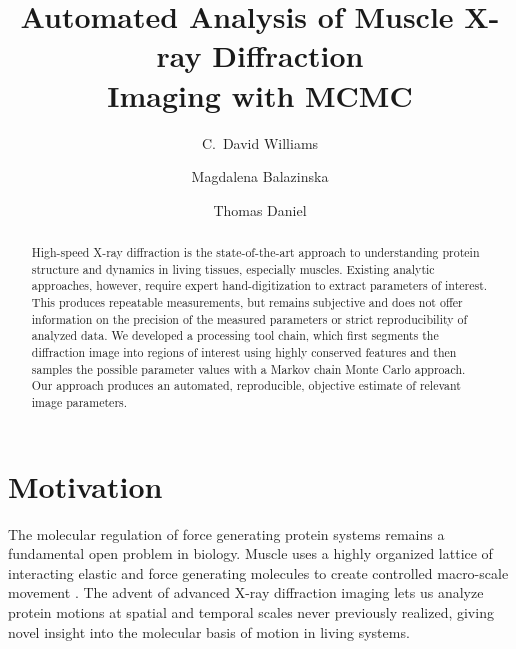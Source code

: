 \documentclass{llncs}
\begin{document}
\frontmatter
\pagestyle{headings}  %


\mainmatter
\title{Automated Analysis of Muscle X-ray Diffraction \\ Imaging with MCMC}
\author{C.\ David Williams \and Magdalena Balazinska \and Thomas Daniel}
\maketitle


\begin{abstract}

  High-speed X-ray diffraction is the state-of-the-art approach to
  understanding protein structure and dynamics in living tissues,
  especially muscles.  Existing analytic approaches, however, require
  expert hand-digitization to extract parameters of interest. This
  produces repeatable measurements, but remains subjective and does
  not offer information on the precision of the measured parameters or
  strict reproducibility of analyzed data.  We developed a processing
  tool chain, which first segments the diffraction image into regions
  of interest using highly conserved features and then samples the
  possible parameter values with a Markov chain Monte Carlo approach.
  Our approach produces an automated, reproducible, objective estimate
  of relevant image parameters.
\end{abstract}


\section{Motivation}
\label{sec:motivation}


The molecular regulation of force generating protein systems remains a
fundamental open problem in biology. Muscle uses a highly organized
lattice of interacting elastic and force generating molecules to
create controlled macro-scale movement \cite{Millman1998}. The advent
of advanced X-ray diffraction imaging lets us analyze protein motions
at spatial and temporal scales never previously realized, giving novel
insight into the molecular basis of motion in living systems.  
\end{document}
